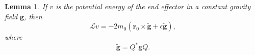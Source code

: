 \documentclass[reqno,12pt]{amsart}
\newcommand{\liederiv}{\mathcal L}
\newtheorem{lemma}{Lemma}
\begin{document}

\begin{lemma}
\label{lambda pot energy}
If $v$ is the potential energy of the end effector in a constant gravity field $\bm g$, then
\begin{equation}
\liederiv v = - 2 m_0 (\bm r_0 \times \tilde{\bm g} + \epsilon \tilde{\bm g}) ,
\end{equation}
where
\begin{equation}
\tilde{\bm g} = Q^* \bm g Q .
\end{equation}
\end{lemma}
\end{document}
